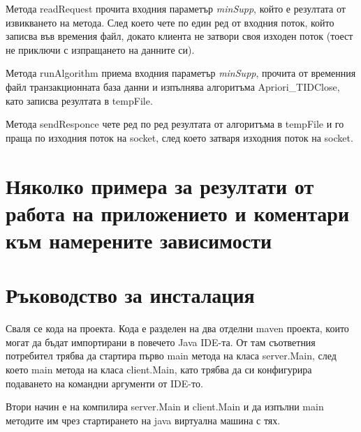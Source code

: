 \documentclass[a4paper, 12pt]{article}
\begin{document}
Метода readRequest прочита входния параметър \textit{minSupp},
който е резултата от извикването на метода.
След което чете по един ред от входния поток,
който записва във времения файл,
докато клиента не затвори своя изходен поток (тоест не приключи с изпращането на данните си).

Метода runAlgorithm приема входния параметър \textit{minSupp}, прочита от временния файл транзакционната база данни
и изпълнява алгоритъма Apriori\_TIDClose, като записва резултата в tempFile.

Метода sendResponce чете ред по ред резултата от алгоритъма в tempFile и го праща по изходния поток на socket,
след което затваря изходния поток на socket.

\section{Няколко примера за резултати от работа на приложението и коментари към намерените зависимости}

\section{Ръководство за инсталация}
Сваля се кода на проекта.
Кода е разделен на два отделни maven проекта, които могат да бъдат импортирани в повечето Java IDE-та.
От там съответния потребител трябва да стартира първо main метода на класа server.Main,
след което main метода на класа client.Main, като трябва да си конфигурира подаването на командни аргументи от IDE-то.

Втори начин е на компилира server.Main и client.Main и да изпълни main методите им чрез стартирането на java виртуална машина с тях.
\end{document}
